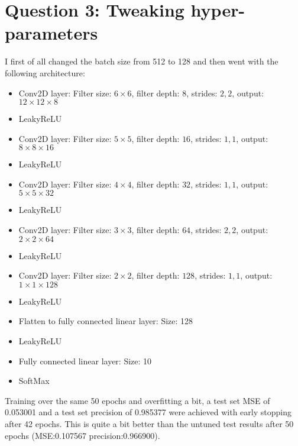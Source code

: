 \documentclass[11pt,a4paper]{article}
\begin{document}
\section{Question 3: Tweaking hyper-parameters}


I first of all changed the batch size from 512 to 128 and then went with the
following architecture:

\begin{itemize}
\item Conv2D layer: Filter size: $6 \times 6$, filter depth: $8$, strides: $2, 2$, output: $12\times12\times8$
\item LeakyReLU
\item Conv2D layer: Filter size: $5 \times 5$, filter depth: $16$, strides: $1, 1$, output: $8\times8\times16$
\item LeakyReLU
\item Conv2D layer: Filter size: $4 \times 4$, filter depth: $32$, strides: $1, 1$, output: $5\times5\times32$
\item LeakyReLU
\item Conv2D layer: Filter size: $3 \times 3$, filter depth: $64$, strides: $2, 2$, output: $2\times2\times64$
\item LeakyReLU
\item Conv2D layer: Filter size: $2 \times 2$, filter depth: $128$, strides: $1, 1$, output: $1\times1\times128$
\item LeakyReLU
\item Flatten to fully connected linear layer: Size: 128
\item LeakyReLU
\item Fully connected linear layer: Size: 10
\item SoftMax
\end{itemize}

Training over the same 50 epochs and overfitting a bit, a test set MSE of 0.053001
and a test set precision of 0.985377 were achieved with early stopping after 42 epochs.
This is quite a bit better than the untuned test results after 50 epochs (MSE:0.107567 precision:0.966900).
\end{document}
